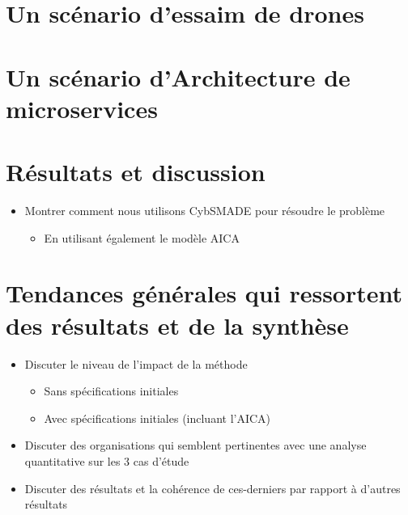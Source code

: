 

\section{Un scénario d'essaim de drones}



\section{Un scénario d'Architecture de microservices}



\section{Résultats et discussion}
\begin{itemize}

    \item Montrer comment nous utilisons CybSMADE pour résoudre le problème
          \begin{itemize}
              \item En utilisant également le modèle AICA
          \end{itemize}
\end{itemize}

\section{Tendances générales qui ressortent des résultats et de la synthèse}
\begin{itemize}
    \item Discuter le niveau de l'impact de la méthode
          \begin{itemize}
              \item Sans spécifications initiales
              \item Avec spécifications initiales (incluant l'AICA)
          \end{itemize}
    \item Discuter des organisations qui semblent pertinentes avec une analyse quantitative sur les 3 cas d'étude
    \item Discuter des résultats et la cohérence de ces-derniers par rapport à d'autres résultats
\end{itemize}